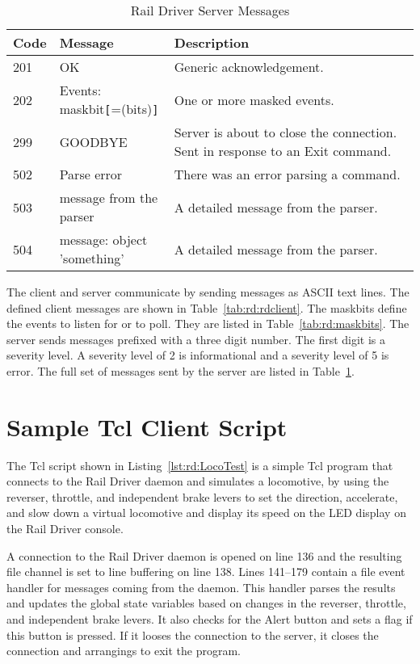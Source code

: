 \begin{table}[hbpt]
\begin{centering}  
\begin{tabular}{|l|l|p{2in}|}
\hline
\textbf{Code} & \textbf{Message} & \textbf{Description} \\
\hline
\hline
201 & OK & Generic acknowledgement.\\
\hline
202 & Events: maskbit\verb=[==(bits)\verb=]=& One or more masked events.\\
\hline
299 & GOODBYE & Server is about to close the connection.  Sent in
response to an Exit command.\\
\hline
502 & Parse error& There was an error parsing a command.\\
\hline
503 & message from the parser& A detailed message from the parser.\\
\hline
504 & message: object 'something'& A detailed message from the parser.\\
\hline
\end{tabular}
\caption{Rail Driver Server Messages}
\label{tab:rd:rdserver}
\end{centering}
\end{table}
The client and server communicate by sending messages as ASCII text
lines.  The defined client messages are shown in
Table~\ref{tab:rd:rdclient}. The maskbits define the events to listen for
or to poll.  They are listed in Table~\ref{tab:rd:maskbits}. The server
sends messages prefixed with a three digit number.  The first digit is a
severity level. A severity level of 2 is informational and a
severity level of 5 is error.  The full set of messages sent by the
server are listed in Table~\ref{tab:rd:rdserver}.

\section{Sample Tcl Client Script}


The Tcl script shown in Listing~\ref{lst:rd:LocoTest} is a simple Tcl program
that connects to the Rail Driver daemon and simulates a locomotive, by
using the reverser, throttle, and independent brake levers to set the
direction, accelerate, and slow down a virtual locomotive and display
its speed on the LED display on the Rail Driver console.

A connection to the Rail Driver daemon is opened on line 136 and the
resulting file channel is set to line buffering on line 138.  Lines
141--179 contain a file event handler for messages coming from the
daemon.  This handler parses the results and updates the global state
variables based on changes in the reverser, throttle, and independent
brake levers.  It also checks for the Alert button and sets a flag if
this button is pressed.  If it looses the connection to the server, it
closes the connection and arrangings to exit the program.


